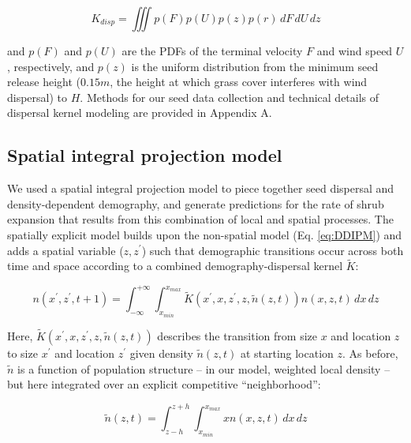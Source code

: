 \documentclass[11pt]{article}\usepackage[]{graphicx}\usepackage[usenames,dvipsnames]{xcolor}
\begin{document}
\begin{linenomath*} \label{eq:Kd}
\begin{equation} K_{disp} = \iiint p(F)p(U)p(z)p(r) \,dF\,dU\,dz \end{equation} 
\end{linenomath*} 

and $p(F)$ and $p(U)$ are the PDFs of the terminal velocity $F$ and wind speed $U$, respectively, and $p(z)$ is the uniform distribution from the minimum seed release height ($0.15m$, the height at which grass cover interferes with wind dispersal) to $H$.
Methods for our seed data collection and technical details of dispersal kernel modeling are provided in Appendix A. 

\subsection*{Spatial integral projection model}

We used a spatial integral projection model to piece together seed dispersal and density-dependent demography, and generate predictions for the rate of shrub expansion that results from this combination of local and spatial processes. 
The spatially explicit model builds upon the non-spatial model (Eq. \ref{eq:DDIPM}) and adds a spatial variable ($z,z^\prime$) such that demographic transitions occur across both time and space according to a combined demography-dispersal kernel $\tilde{K}$:

\begin{linenomath*} 
\begin{equation} \label{eq:SIPM}
n(x^\prime,z^\prime,t + 1) = \int_{-\infty}^{+\infty} \int_{x_{min}}^{x_{max}} \tilde{K}(x^\prime,x,z^\prime,z,\tilde{n}(z,t)) n(x,z,t) \,dx \,dz 
\end{equation} 
\end{linenomath*}

Here, $\tilde{K}(x^\prime,x,z^\prime,z,\tilde{n}(z,t))$ describes the transition from size $x$ and location $z$ to size $x^\prime$ and location $z^\prime$ given density $\tilde{n}(z,t)$ at starting location $z$.
As before, $\tilde{n}$ is a function of population structure -- in our model, weighted local density -- but here integrated over an explicit competitive ``neighborhood'': 

\begin{linenomath*} 
\begin{equation} \label{eq:neighborhood}
\tilde{n}(z,t)=\int_{z-h}^{z+h} \int_{x_{min}}^{x_{max}} x n(x,z,t) \,dx \,dz
\end{equation} 
\end{linenomath*}
\end{document}

